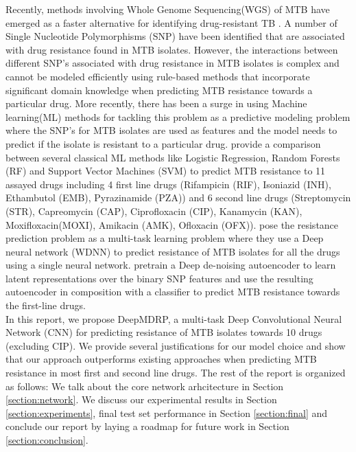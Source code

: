 \documentclass{article}
\begin{document}
\setlength{\parindent}{2ex}
Recently, methods involving Whole Genome Sequencing(WGS) of MTB have emerged as a faster alternative for
identifying drug-resistant TB \cite{article}. A number of Single Nucleotide Polymorphisms (SNP) have been identified that are associated
with drug resistance found in MTB isolates. However, the interactions between different SNP's associated 
with drug resistance in MTB isolates is complex and cannot be modeled efficiently using rule-based
methods that incorporate significant domain knowledge when predicting MTB resistance towards a particular drug.
More recently, there has been a surge in using Machine learning(ML) methods for tackling this problem as a predictive
modeling problem where the SNP's for MTB isolates are used as features and the model needs to predict if the
isolate is resistant to a particular drug. \cite{10.1093/bioinformatics/btx801} provide a comparison between several classical ML methods like
Logistic Regression, Random Forests (RF) and Support Vector Machines (SVM) to predict MTB resistance to 11 assayed drugs
including 4 first line drugs (Rifampicin (RIF), Isoniazid (INH), Ethambutol (EMB), Pyrazinamide (PZA)) and
6 second line drugs (Streptomycin (STR), Capreomycin (CAP), Ciprofloxacin (CIP), Kanamycin (KAN), Moxifloxacin(MOXI),
Amikacin (AMK), Ofloxacin (OFX)). \cite{CHEN2019356} pose the resistance prediction problem as a multi-task learning problem where
they use a Deep neural network (WDNN) to predict resistance of MTB isolates for all the drugs using a single
neural network. \cite{10.1093/bioinformatics/btz067} pretrain a Deep de-noising autoencoder to learn latent representations over the binary SNP features
and use the resulting autoencoder in composition with a classifier to predict MTB resistance towards the first-line drugs.\\

In this report, we propose DeepMDRP, a multi-task Deep Convolutional Neural Network (CNN) for predicting resistance of MTB isolates
towards 10 drugs (excluding CIP). We provide several justifications for our model choice and show that our
approach outperforms existing approaches when predicting MTB resistance in most first and second line drugs. The rest of
the report is organized as follows: We talk about the core network arhcitecture in Section \ref{section:network}.
We discuss our experimental results in Section \ref{section:experiments}, final test set performance in
Section \ref{section:final} and conclude our report by laying a roadmap for future work in 
Section \ref{section:conclusion}.
\end{document}
